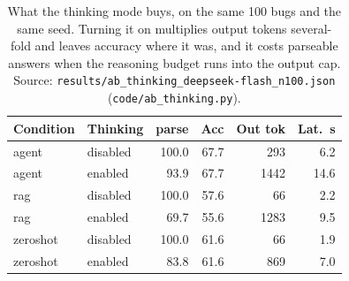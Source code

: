 \begin{table}[t]\centering
\small
\caption{What the thinking mode buys, on the same 100 bugs and the same seed. Turning it on multiplies output tokens several-fold and leaves accuracy where it was, and it costs parseable answers when the reasoning budget runs into the output cap. Source: \texttt{results/ab\_thinking\_deepseek-flash\_n100.json} (\texttt{code/ab\_thinking.py}).}
\label{tab:thinking-deepseek-flash}
\begin{tabular}{llrrrr}
\toprule
Condition & Thinking & parse & Acc & Out tok & Lat.\ s \\
\midrule
agent & disabled & 100.0 & 67.7 & 293 & 6.2 \\
agent & enabled & 93.9 & 67.7 & 1442 & 14.6 \\
rag & disabled & 100.0 & 57.6 & 66 & 2.2 \\
rag & enabled & 69.7 & 55.6 & 1283 & 9.5 \\
zeroshot & disabled & 100.0 & 61.6 & 66 & 1.9 \\
zeroshot & enabled & 83.8 & 61.6 & 869 & 7.0 \\
\bottomrule
\end{tabular}
\end{table}

